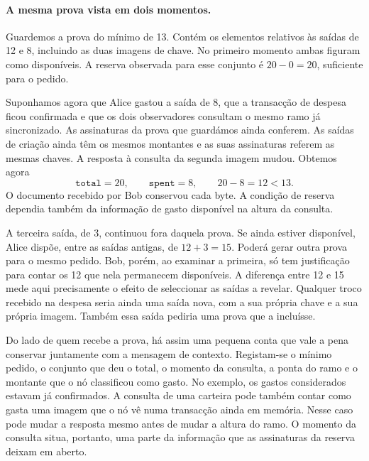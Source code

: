 \paragraph{A mesma prova vista em dois momentos.}
Guardemos a prova do mínimo de 13. Contém os elementos relativos às
saídas de 12 e 8, incluindo as duas imagens de chave. No primeiro
momento ambas figuram como disponíveis. A reserva observada para
esse conjunto é \(20-0=20\), suficiente para o pedido.

Suponhamos agora que Alice gastou a saída de 8, que a transacção de
despesa ficou confirmada e que os dois observadores consultam o mesmo
ramo já sincronizado. As assinaturas da prova que guardámos ainda
conferem. As saídas de criação ainda têm os mesmos montantes e as suas
assinaturas referem as mesmas chaves. A resposta à consulta da segunda
imagem mudou. Obtemos agora
\[
   \texttt{total}=20,\qquad \texttt{spent}=8,\qquad 20-8=12<13 .
\]
O documento recebido por Bob conservou cada byte. A condição de reserva
dependia também da informação de gasto disponível na altura da consulta.

A terceira saída, de 3, continuou fora daquela prova. Se ainda estiver
disponível, Alice dispõe, entre as saídas antigas, de \(12+3=15\).
Poderá gerar outra prova para o mesmo pedido. Bob, porém, ao examinar a
primeira, só tem justificação para contar os 12 que nela permanecem
disponíveis. A diferença entre 12 e 15 mede aqui precisamente o efeito
de seleccionar as saídas a revelar. Qualquer troco recebido na despesa
seria ainda uma saída nova, com a sua própria chave e a sua própria
imagem. Também essa saída pediria uma prova que a incluísse.

Do lado de quem recebe a prova, há assim uma pequena conta que vale a
pena conservar juntamente com a mensagem de contexto. Registam-se o
mínimo pedido, o conjunto que deu o total, o momento da consulta,
a ponta do ramo e o montante que o nó classificou como gasto. No
exemplo, os gastos considerados estavam já confirmados. A consulta de
uma carteira pode também contar como gasta uma imagem que o nó vê
numa transacção ainda em memória. Nesse caso pode mudar a resposta
mesmo antes de mudar a altura do ramo. O momento da consulta situa,
portanto, uma parte da informação que as assinaturas da reserva deixam
em aberto.
